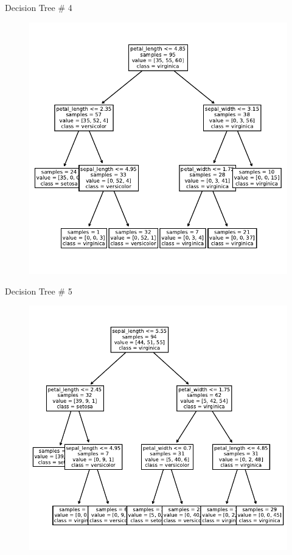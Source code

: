 \documentclass{beamer}
\begin{document}
\begin{frame}{Decision Tree \# 4}
  \begin{figure}
    \includegraphics[scale=0.7]{tree-4.pdf}
  \end{figure}
\end{frame}


\begin{frame}{Decision Tree \# 5}
  \begin{figure}
    \includegraphics[scale=0.7]{tree-5.pdf}
  \end{figure}
\end{frame}
\end{document}
